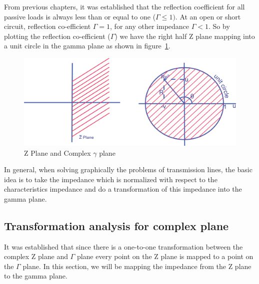 From previous chapters, it was established that the reflection coefficient for all passive loads is always less than or equal to one ($\Gamma\leq 1)$. At an open or short circuit, reflection co-efficient $\Gamma = 1$, for any other impedance $\Gamma < 1$. So by plotting the reflection co-efficient ($\Gamma$) we have the right half Z plane mapping into a unit circle in the gamma plane as shown in figure~\ref{fig:oiuhgvcx}.
\begin{figure}[h]
\centering
\includegraphics[width=0.7\linewidth]{./graphics/oiuhgvcx}
\caption{Z Plane and Complex $\gamma$ plane}
\label{fig:oiuhgvcx}
\end{figure}

In general, when solving graphically the problems of transmission lines, the basic idea is to take the impedance which is normalized with respect to the characteristics impedance and do a transformation of this impedance into the gamma plane.

\subsection{Transformation analysis for complex plane}
It was established that since there is a one-to-one transformation between the complex Z plane and $\Gamma$ plane every point on the Z plane is mapped to a point on the $ \Gamma$ plane. In this section, we will be mapping the impedance from the Z plane to the gamma plane.

